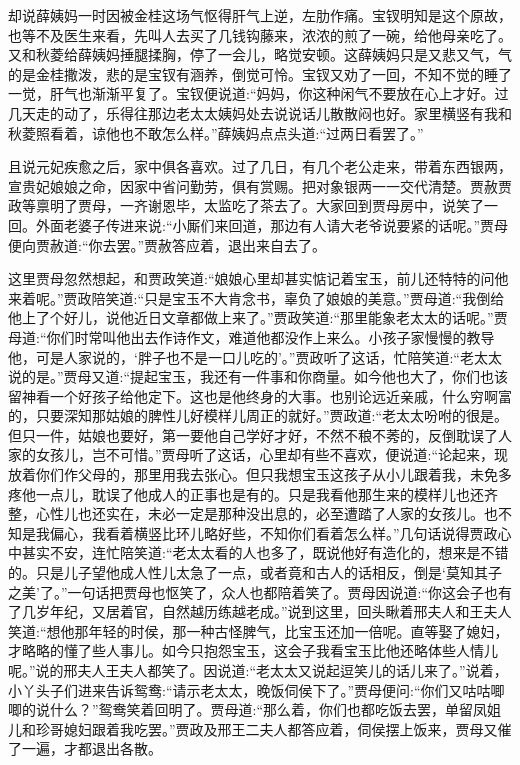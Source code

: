 


\begin{parag}
    却说薛姨妈一时因被金桂这场气怄得肝气上逆，左肋作痛。宝钗明知是这个原故，也等不及医生来看，先叫人去买了几钱钩藤来，浓浓的煎了一碗，给他母亲吃了。又和秋菱给薛姨妈捶腿揉胸，停了一会儿，略觉安顿。这薛姨妈只是又悲又气，气的是金桂撒泼，悲的是宝钗有涵养，倒觉可怜。宝钗又劝了一回，不知不觉的睡了一觉，肝气也渐渐平复了。宝钗便说道:“妈妈，你这种闲气不要放在心上才好。过几天走的动了，乐得往那边老太太姨妈处去说说话儿散散闷也好。家里横竖有我和秋菱照看着，谅他也不敢怎么样。”薛姨妈点点头道:“过两日看罢了。”
\end{parag}


\begin{parag}
    且说元妃疾愈之后，家中俱各喜欢。过了几日，有几个老公走来，带着东西银两，宣贵妃娘娘之命，因家中省问勤劳，俱有赏赐。把对象银两一一交代清楚。贾赦贾政等禀明了贾母，一齐谢恩毕，太监吃了茶去了。大家回到贾母房中，说笑了一回。外面老婆子传进来说:“小厮们来回道，那边有人请大老爷说要紧的话呢。”贾母便向贾赦道:“你去罢。”贾赦答应着，退出来自去了。
\end{parag}


\begin{parag}
    这里贾母忽然想起，和贾政笑道:“娘娘心里却甚实惦记着宝玉，前儿还特特的问他来着呢。”贾政陪笑道:“只是宝玉不大肯念书，辜负了娘娘的美意。”贾母道:“我倒给他上了个好儿，说他近日文章都做上来了。”贾政笑道:“那里能象老太太的话呢。”贾母道:“你们时常叫他出去作诗作文，难道他都没作上来么。小孩子家慢慢的教导他，可是人家说的，‘胖子也不是一口儿吃的’。”贾政听了这话，忙陪笑道:“老太太说的是。”贾母又道:“提起宝玉，我还有一件事和你商量。如今他也大了，你们也该留神看一个好孩子给他定下。这也是他终身的大事。也别论远近亲戚，什么穷啊富的，只要深知那姑娘的脾性儿好模样儿周正的就好。”贾政道:“老太太吩咐的很是。但只一件，姑娘也要好，第一要他自己学好才好，不然不稂不莠的，反倒耽误了人家的女孩儿，岂不可惜。”贾母听了这话，心里却有些不喜欢，便说道:“论起来，现放着你们作父母的，那里用我去张心。但只我想宝玉这孩子从小儿跟着我，未免多疼他一点儿，耽误了他成人的正事也是有的。只是我看他那生来的模样儿也还齐整，心性儿也还实在，未必一定是那种没出息的，必至遭踏了人家的女孩儿。也不知是我偏心，我看着横竖比环儿略好些，不知你们看着怎么样。”几句话说得贾政心中甚实不安，连忙陪笑道:“老太太看的人也多了，既说他好有造化的，想来是不错的。只是儿子望他成人性儿太急了一点，或者竟和古人的话相反，倒是‘莫知其子之美’了。”一句话把贾母也怄笑了，众人也都陪着笑了。贾母因说道:“你这会子也有了几岁年纪，又居着官，自然越历练越老成。”说到这里，回头瞅着邢夫人和王夫人笑道:“想他那年轻的时侯，那一种古怪脾气，比宝玉还加一倍呢。直等娶了媳妇，才略略的懂了些人事儿。如今只抱怨宝玉，这会子我看宝玉比他还略体些人情儿呢。”说的邢夫人王夫人都笑了。因说道:“老太太又说起逗笑儿的话儿来了。”说着，小丫头子们进来告诉鸳鸯:“请示老太太，晚饭伺侯下了。”贾母便问:“你们又咕咕唧唧的说什么？”鸳鸯笑着回明了。贾母道:“那么着，你们也都吃饭去罢，单留凤姐儿和珍哥媳妇跟着我吃罢。”贾政及邢王二夫人都答应着，伺侯摆上饭来，贾母又催了一遍，才都退出各散。
\end{parag}


